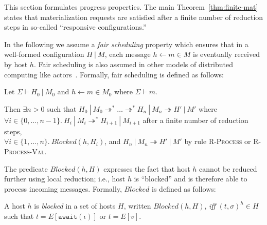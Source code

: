 This section formulates progress properties. The main
Theorem~\ref{thm:finite-mat} states that materialization requests are
satisfied after a finite number of reduction steps in so-called
``responsive configurations.''

In the following we assume a {\em fair scheduling} property which
ensures that in a well-formed configuration $H~|~M$, each message $h
\leftarrow m \in M$ is eventually received by host $h$. Fair
scheduling is also assumed in other models of distributed computing
like actors~\cite{Actors,Talcott}. Formally, fair scheduling is
defined as follows:

\begin{defn}\label{def:fair-scheduling}
  Let $\Sigma \vdash H_0~|~M_0$ and $h \leftarrow m \in M_0$ where
  $\Sigma \vdash m$.

  Then $\exists n > 0$ such that $H_0~|~M_0 \twoheadrightarrow^*
  \ldots \twoheadrightarrow^* H_n~|~M_n \twoheadrightarrow H'~|~M'$
  where \\$\forall i \in \{ 0, \ldots, n-1 \}.~H_i~|~M_i
  \twoheadrightarrow^* H_{i+1}~|~M_{i+1}$ after a finite number of
  reduction steps, \\$\forall i \in \{ 1, \ldots, n
  \}.~\mathit{Blocked}(h, H_i)$, and $H_n~|~M_n \twoheadrightarrow
  H'~|~M'$ by rule \textsc{R-Process} or \textsc{R-Process-Val}.
\end{defn}

The predicate $\mathit{Blocked}(h, H)$ expresses the fact that host
$h$ cannot be reduced further using local reduction; i.e., host $h$ is
``blocked'' and is therefore able to process incoming
messages. Formally, $\mathit{Blocked}$ is defined as follows:

\begin{defn}\label{def:blocked-host}
  A host $h$ is {\em blocked} in a set of hosts $H$, written
  $\mathit{Blocked}(h, H)$, {\em iff} $(t, \sigma)^h \in H$ such that
  $t = E[\texttt{await}(\iota)]$ or $t = E[v]$.
\end{defn}
